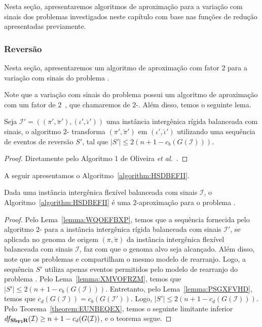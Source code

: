 Nesta seção, apresentaremos algoritmos de aproximação para a variação com sinais dos problemas investigados neste capítulo com base nas funções de redução apresentadas previamente.

\subsubsection{Reversão}

Nesta seção, apresentaremos um algoritmo de aproximação com fator $2$ para a variação com sinais do problema \SbFIR{}. 

Note que a variação com sinais do problema \SbIR{} possui um algoritmo de aproximação com um fator de $2$~\cite{2021a-oliveira-etal}, que chamaremos de $2$-\SbIR{}. Além disso, temos o seguinte lema.

\begin{lemma}\label{lemma:XMVOFRZM}
Seja $\mathcal{I}' = ((\pi',\breve\pi'),(\iota',\breve\iota'))$ uma instância intergênica rígida balanceada com sinais, o algoritmo $2$-\SbIR{} transforma $(\pi',\breve\pi')$ em $(\iota',\breve\iota')$ utilizando uma sequência de eventos de reversão $S'$, tal que $|S'| \le 2({n+1} - c_b(G(\mathcal{I})))$.
\end{lemma}
\begin{proof}
Diretamente pelo Algoritmo 1 de Oliveira \textit{et al.}~\cite{2021b-oliveira-etal}.
\end{proof}

A seguir apresentamos o Algoritmo~\ref{algorithm:HSDBEFII}.



\begin{theorem}\label{theorem:GTWKCOJR}
Dada uma instância intergênica flexível balanceada com sinais $\mathcal{I}$, o Algoritmo~\ref{algorithm:HSDBEFII} é uma $2$-aproximação para o problema \SbFIR{}.
\end{theorem}
\begin{proof}
Pelo Lema~\ref{lemma:WQOEFBXP}, temos que a sequência fornecida pelo algoritmo $2$-\SbIR{} para a instância intergênica rígida balanceada com sinais $\mathcal{I'}$, se aplicada no genoma de origem $(\pi,\breve\pi)$ da instância intergênica flexível balanceada com sinais $\mathcal{I}$, faz com que o genoma alvo seja alcançado. Além disso, note que os problemas \SbIR{} e \SbFIR{} compartilham o mesmo modelo de rearranjo. Logo, a sequência $S'$ utiliza apenas eventos permitidos pelo modelo de rearranjo do problema \SbFIR{}. Pelo Lema~\ref{lemma:XMVOFRZM}, temos que $|S'| \le 2({n+1} - c_b(G(\mathcal{I})))$. Entretanto, pelo Lema~\ref{lemma:PSGXFVHD}, temos que $c_d(G(\mathcal{I})) = c_b(G(\mathcal{I}'))$. Logo, $|S'| \le 2({n+1} - c_d(G(\mathcal{I})))$. Pelo Teorema~\ref{theorem:EUNBEQEX}, temos o seguinte limitante inferior $df_{\textbf{Sb\textsubscript{FI}R}}(\mathcal{I}) \ge {n+1} - c_d(G(\mathcal{I}))$, e o teorema segue.
\end{proof}


